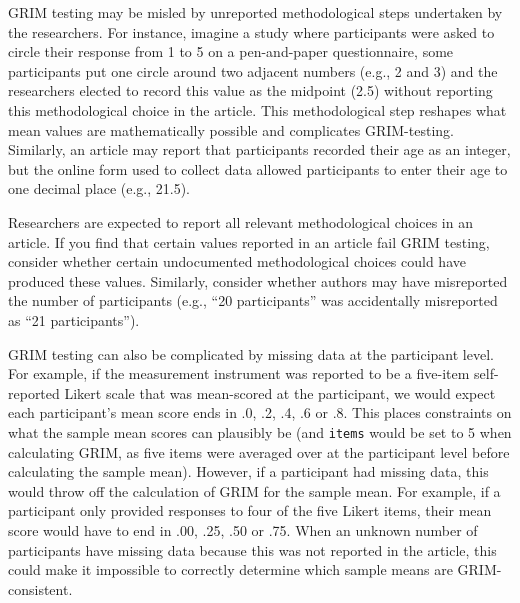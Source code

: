 \documentclass[letterpaper, 12pt]{article}
\begin{document}
GRIM testing may be misled by unreported methodological steps undertaken by the researchers. For instance, imagine a study where participants were asked to circle their response from 1 to 5 on a pen-and-paper questionnaire, some participants put one circle around two adjacent numbers (e.g., 2 and 3) and the researchers elected to record this value as the midpoint (2.5) without reporting this methodological choice in the article. This methodological step reshapes what mean values are mathematically possible and complicates GRIM-testing. Similarly, an article may report that participants recorded their age as an integer, but the online form used to collect data allowed participants to enter their age to one decimal place (e.g., 21.5). 

Researchers are expected to report all relevant methodological choices in an article. If you find that certain values reported in an article fail GRIM testing, consider whether certain undocumented methodological choices could have produced these values. Similarly, consider whether authors may have misreported the number of participants (e.g., ``20 participants'' was accidentally misreported as ``21 participants'').

GRIM testing can also be complicated by missing data at the participant level. For example, if the measurement instrument was reported to be a five-item self-reported Likert scale that was mean-scored at the participant, we would expect each participant's mean score ends in .0, .2, .4, .6 or .8. This places constraints on what the sample mean scores can plausibly be (and \texttt{items} would be set to 5 when calculating GRIM, as five items were averaged over at the participant level before calculating the sample mean). However, if a participant had missing data, this would throw off the calculation of GRIM for the sample mean. For example, if a participant only provided responses to four of the five Likert items, their mean score would have to end in .00, .25, .50 or .75. When an unknown number of participants have missing data because this was not reported in the article, this could make it impossible to correctly determine which sample means are GRIM-consistent.
\end{document}
